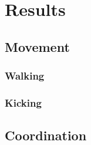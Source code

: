 \chapter{Results}
\label{results}

\section{Movement}

\subsection{Walking}

\subsection{Kicking}



\section{Coordination}